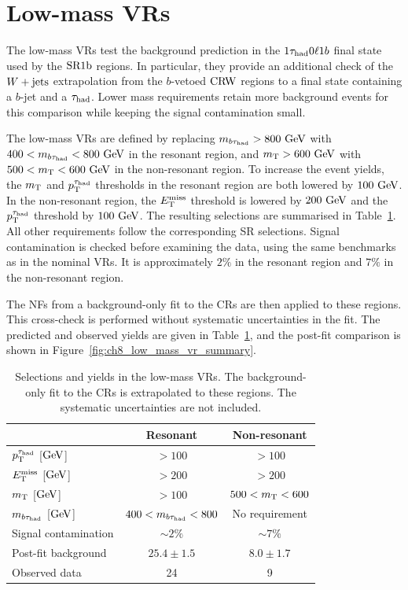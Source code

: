 \section[Low-mass VRs]{Low-mass VRs}
\label{subsec:low_mass_vr}

The low-mass VRs test the background prediction in the $1\tau_{\mathrm{had}}0\ell1b$ final state used by the $\mathrm{SR1b}$ regions. In particular, they provide an additional check of the $W+\mathrm{jets}$ extrapolation from the $b$-vetoed $\mathrm{CRW}$ regions to a final state containing a $b$-jet and a $\tau_{\mathrm{had}}$. Lower mass requirements retain more background events for this comparison while keeping the signal contamination small.

The low-mass VRs are defined by replacing $m_{b\tau_{\mathrm{had}}}>800~\mathrm{GeV}$ with $400<m_{b\tau_{\mathrm{had}}}<800~\mathrm{GeV}$ in the resonant region, and $m_{\mathrm{T}}>600~\mathrm{GeV}$ with $500<m_{\mathrm{T}}<600~\mathrm{GeV}$ in the non-resonant region.
To increase the event yields, the $m_{\mathrm{T}}$ and $p_{\mathrm{T}}^{\tau_{\mathrm{had}}}$ thresholds in the resonant region are both lowered by $100~\mathrm{GeV}$.
In the non-resonant region, the $E_{\mathrm{T}}^{\mathrm{miss}}$ threshold is lowered by $200~\mathrm{GeV}$ and the $p_{\mathrm{T}}^{\tau_{\mathrm{had}}}$ threshold by $100~\mathrm{GeV}$.
The resulting selections are summarised in Table~\ref{tab:low_mass_vr}. All other requirements follow the corresponding SR selections.
Signal contamination is checked before examining the data, using the same benchmarks as in the nominal VRs.
It is approximately $2\%$ in the resonant region and $7\%$ in the non-resonant region.

The NFs from a background-only fit to the CRs are then applied to these regions.
This cross-check is performed without systematic uncertainties in the fit.
The predicted and observed yields are given in Table~\ref{tab:low_mass_vr}, and the post-fit comparison is shown in Figure~\ref{fig:ch8_low_mass_vr_summary}.

\begin{table}[htbp]
    \centering
    \small
    \caption[Selections and yields in the low-mass VRs]{Selections and yields in the low-mass VRs. The background-only fit to the CRs is extrapolated to these regions. The systematic uncertainties are not included.}
    \label{tab:low_mass_vr}
    \begin{tabular}{lcc}
        \toprule
         & Resonant & Non-resonant \\
        \midrule
        $p_{\mathrm{T}}^{\tau_{\mathrm{had}}}$ [$\mathrm{GeV}$] & $>100$ & $>100$ \\
        $E_{\mathrm{T}}^{\mathrm{miss}}$ [$\mathrm{GeV}$] & $>200$ & $>200$ \\
        $m_{\mathrm{T}}$ [$\mathrm{GeV}$] & $>100$ & $500<m_{\mathrm{T}}<600$ \\
        $m_{b\tau_{\mathrm{had}}}$ [$\mathrm{GeV}$] & $400<m_{b\tau_{\mathrm{had}}}<800$ & No requirement \\
        \midrule
        Signal contamination & $\sim2\%$ & $\sim7\%$ \\
        Post-fit background & $25.4\pm1.5$ & $8.0\pm1.7$ \\
        Observed data & 24 & 9 \\
        \bottomrule
    \end{tabular}
\end{table}

